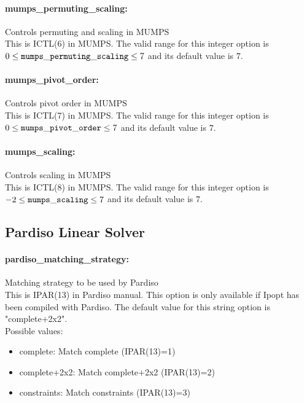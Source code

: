 \paragraph{mumps\_permuting\_scaling:}\label{sec:mumps_permuting_scaling} Controls permuting and scaling in MUMPS $\;$ \\
 This is ICTL(6) in MUMPS. The valid range for this integer option is
$0 \le {\tt mumps\_permuting\_scaling } \le 7$
and its default value is $7$.


\paragraph{mumps\_pivot\_order:}\label{sec:mumps_pivot_order} Controls pivot order in MUMPS $\;$ \\
 This is ICTL(7) in MUMPS. The valid range for this integer option is
$0 \le {\tt mumps\_pivot\_order } \le 7$
and its default value is $7$.


\paragraph{mumps\_scaling:}\label{sec:mumps_scaling} Controls scaling in MUMPS $\;$ \\
 This is ICTL(8) in MUMPS. The valid range for this integer option is
$-2 \le {\tt mumps\_scaling } \le 7$
and its default value is $7$.


\subsection{Pardiso Linear Solver}

\paragraph{pardiso\_matching\_strategy:}\label{sec:pardiso_matching_strategy} Matching strategy to be used by Pardiso $\;$ \\
 This is IPAR(13) in Pardiso manual.  This option
is only available if Ipopt has been compiled with
Pardiso.
The default value for this string option is "complete+2x2".
\\ 
Possible values:
\begin{itemize}
   \item complete: Match complete (IPAR(13)=1)
   \item complete+2x2: Match complete+2x2 (IPAR(13)=2)
   \item constraints: Match constraints (IPAR(13)=3)
\end{itemize}

